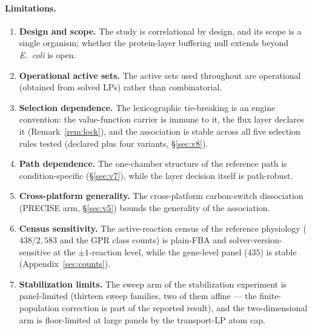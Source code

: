 \documentclass[11pt,a4paper]{article}
\theoremstyle{plain}
\theoremstyle{definition}
\theoremstyle{remark}
\begin{document}
\paragraph{Limitations.}
\begin{enumerate}[label=\textbf{\arabic*.},leftmargin=2.2em,itemsep=2pt]
\item \textbf{Design and scope.} The study is correlational by
      design, and its scope is a single organism; whether the
      protein-layer buffering null extends beyond \emph{E.~coli} is
      open.
\item \textbf{Operational active sets.} The active sets used
      throughout are operational (obtained from solved LPs) rather
      than combinatorial.
\item \textbf{Selection dependence.} The lexicographic tie-breaking
      is an engine convention: the value-function carrier is immune
      to it, the flux layer declares it (Remark~\ref{rem:lock}), and
      the association is stable across all five selection rules
      tested (declared plus four variants, \S\ref{sec:v8}).
\item \textbf{Path dependence.} The one-chamber structure of the
      reference path is condition-specific (\S\ref{sec:v7}), while
      the layer decision itself is path-robust.
\item \textbf{Cross-platform generality.} The cross-platform
      carbon-switch dissociation (PRECISE arm, \S\ref{sec:v5})
      bounds the generality of the association.
\item \textbf{Census sensitivity.} The active-reaction census of the
      reference physiology ($438/2{,}583$
      and the GPR class counts) is plain-FBA and solver-version-sensitive
      at the $\pm 1$-reaction level, while the gene-level panel ($435$) is
      stable (Appendix~\ref{sec:counts}).
\item \textbf{Stabilization limits.} The sweep arm of the
      stabilization experiment is panel-limited (thirteen sweep
      families, two of them affine --- the finite-population
      correction is part of the reported result), and the
      two-dimensional arm is floor-limited at large panels by the
      transport-LP atom cap.
\end{enumerate}
\end{document}
